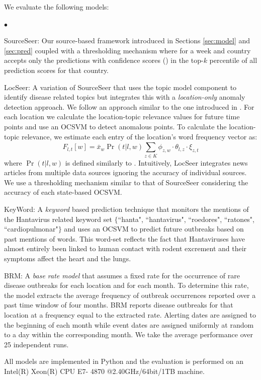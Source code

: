 \documentclass[twoside,leqno,twocolumn]{article}
\newcommand{\squishlist}{
   \begin{list}{$\bullet$}
    {
      \setlength{\itemsep}{0pt}
      \setlength{\parsep}{3pt}
      \setlength{\topsep}{3pt}
      \setlength{\partopsep}{0pt}
      \setlength{\leftmargin}{1.5em}
      \setlength{\labelwidth}{1em}
      \setlength{\labelsep}{0.5em} } }
\newcommand{\squishend}{
    \end{list}  }
\newcommand{\fullmodel}{{{\sf SourceSeer}}\xspace}
\newcommand{\locationmodel}{{\sf LocSeer}\xspace}
\newcommand{\keymodel}{{\sf KeyWord}\xspace}
\begin{document}
\vspace{5pt} We evaluate the following models:
\squishlist
\item \fullmodel: Our source-based framework introduced in Sections \ref{sec:model} and \ref{sec:pred} coupled with a thresholding mechanism where for a week and country accepts only the predictions with confidence scores () in the top-$k$ percentile of all prediction scores for that country.
\item \locationmodel: A variation of \fullmodel that uses the topic model component to identify disease related topics but integrates this with a {\em location-only} anomaly detection approach. We follow an approach similar to the one introduced in . For each location we calculate the location-topic relevance values for future time points and use an OCSVM  to detect anomalous points. To calculate the location-topic relevance, we estimate each entry of the location's word frequency vector as: 
\begin{equation}
\hat{F}_{l,t}[w] = \bar{x}_{w} \Pr(t|l,w) \sum_{z \in K}\phi_{z,w}\cdot \theta_{l,z} \cdot \xi_{z,t}	
\end{equation}
where $\Pr(t|l,w)$ is defined similarly to . Intuitively,  \locationmodel integrates news articles from multiple data sources ignoring the accuracy of individual sources. We use a thresholding mechanism similar to that of \fullmodel considering the accuracy of each state-based OCSVM. 
\item \keymodel: A {\em keyword} based prediction technique that monitors the mentions of the Hantavirus related keyword set $\{$``hanta", ``hantavirus", ``roedores", ``ratones", ``cardiopulmonar"$\}$ and uses an OCSVM to predict future outbreaks based on past mentions of words. This word-set reflects the fact that Hantaviruses have almost entirely been linked to human contact with rodent excrement and their symptoms affect the heart and the lungs.
\item BRM: A {\em base rate model} that assumes a fixed rate for the occurrence of rare disease outbreaks for each location and for each
month. To determine this rate, the model extracts the average frequency of outbreak occurrences reported over a past time window of four months. BRM reports disease outbreaks for that location at a frequency equal to the extracted rate. Alerting dates are assigned to the beginning of each month while event dates are assigned uniformly at random to a day within the corresponding month. We take the average performance over 25 independent runs.
\squishend
All models are implemented in Python and the evaluation is performed on an Intel(R) Xeon(R) CPU E7- 4870 @2.40GHz/64bit/1TB machine. 
\end{document}
